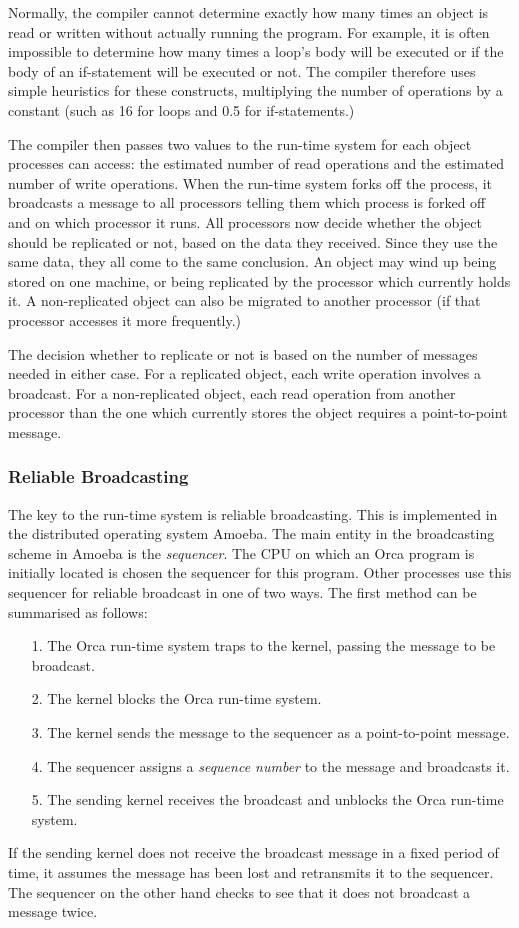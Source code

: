 Normally, the compiler cannot determine exactly how many times an object is read
or written without actually running the program. For example, it is often 
impossible to
determine how many times a loop's body will be executed or if
the body of an if-statement will be executed or not. The
compiler
therefore uses simple heuristics for these constructs, multiplying the
number of operations by a constant (such as 16 for loops and 0.5 for
if-statements.)

The compiler then passes two values to the run-time system for each
object processes can access: the estimated number of read
operations and the estimated number of write
operations. When the run-time system forks off the process, it broadcasts a
message to all processors telling them which process is forked off and
on which processor it runs. All processors now decide
whether the object should be replicated or not, based on the data they
received. Since they use the same data, they all come to the same conclusion.
An object may wind up being stored on one machine, or being replicated by
the processor which currently holds it. 
A non-replicated object can also be migrated to another processor (if that
processor accesses it more frequently.)

The decision whether to replicate or not is based on the number of
messages needed in either case. For a replicated object, each write
operation involves a broadcast. For a non-replicated object, each read
operation from another processor than the one which currently stores
the object requires a point-to-point message.

\subsubsection{Reliable Broadcasting}

The key to the run-time system is reliable broadcasting.
This is implemented in the distributed operating system
Amoeba. The main entity in the broadcasting scheme in Amoeba is the {\em
sequencer}.  The CPU on which an Orca program is initially located is chosen
the sequencer for this program. Other processes use this sequencer
for reliable
broadcast in one of two ways. The first method can be summarised as
follows:
\begin{itemize}
        \item[1.] The Orca run-time system traps to the kernel, passing
	the message to be broadcast.
        \item[2.] The kernel blocks the Orca run-time system.
        \item[3.] The kernel sends the message to the sequencer as a
        point-to-point message.
        \item[4.] The sequencer assigns a {\em sequence number} to the
        message and broadcasts it.
        \item[5.] The sending kernel receives the broadcast and unblocks
        the Orca run-time system.
\end{itemize}
If the sending kernel does not receive the broadcast message in a
fixed period of time, it assumes the message has been lost and retransmits it
to the sequencer. The sequencer on the other hand checks to see that it
does not broadcast a message twice.


